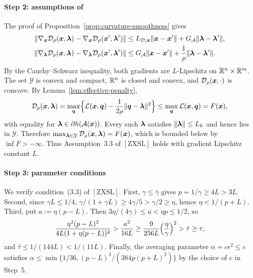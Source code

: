 \paragraph{Step 2: assumptions of~\cite[Theorem~3.4]{zhang2020smoothed}}
The proof of Proposition~\ref{prop:curvature-smoothness} gives
\[
\begin{aligned}
\|\nabla_{\bm{x}}\mathcal{D}_\rho(\bm{x},\bm{\lambda})-\nabla_{\bm{x}}\mathcal{D}_\rho(\bm{x}',\bm{\lambda}')\|
&\le L_{\mathcal{D},\bm{x}}\|\bm{x}-\bm{x}'\|+G_{\mathcal{A}}\|\bm{\lambda}-\bm{\lambda}'\|,\\
\|\nabla_{\bm{\lambda}}\mathcal{D}_\rho(\bm{x},\bm{\lambda})-\nabla_{\bm{\lambda}}\mathcal{D}_\rho(\bm{x}',\bm{\lambda}')\|
&\le G_{\mathcal{A}}\|\bm{x}-\bm{x}'\|+\frac1\rho\|\bm{\lambda}-\bm{\lambda}'\|.
\end{aligned}
\]
By the Cauchy--Schwarz inequality, both gradients are \(L\)-Lipschitz on
\(\mathbb{R}^n\times\mathbb{R}^m\). The set \(\mathcal Y\) is convex and compact,
\(\mathbb{R}^n\) is closed and convex, and \(\mathcal{D}_\rho(\bm{x},\cdot)\) is concave. By
Lemma~\ref{lem:effective-penalty},
\[
\mathcal{D}_\rho(\bm{x},\bm{\lambda})
=\max_{\bm{q}}\Bigl\{\mathcal{L}(\bm{x},\bm{q})-\frac1{2\rho}\|\bm{q}-\bm{\lambda}\|^2\Bigr\}
\le\max_{\bm{q}}\mathcal{L}(\bm{x},\bm{q})=F(\bm{x}),
\]
with equality for \(\bm{\lambda}\in\partial h(\mathcal{A}(\bm{x}))\). Every such
\(\bm{\lambda}\) satisfies \(\|\bm{\lambda}\|\le L_h\) and hence lies in \(\mathcal Y\).
Therefore \(\max_{\bm{\lambda}\in\mathcal Y}\mathcal{D}_\rho(\bm{x},\bm{\lambda})=F(\bm{x})\), which
is bounded below by \(\inf F>-\infty\). Thus Assumption~3.3 of
\([\mathrm{ZXSL}]\) holds with gradient Lipschitz constant \(L\).

\paragraph{Step 3: parameter conditions}
We verify condition~(3.3) of \([\mathrm{ZXSL}]\). First,
\(\gamma\le\bar\gamma\) gives \(p=1/\gamma\ge4L>3L\). Second, since
\(\gamma L\le1/4\),
\(\gamma/(1+\gamma L)\ge4\gamma/5>\gamma/2\ge\eta\), hence
\(\eta<1/(p+L)\). Third, put \(a:=\eta(p-L)\). Then
\(3\eta/(4\gamma)\le a<\eta p\le1/2\), so
\[
\frac{\eta^2(p-L)^2}{4L(1+\eta(p-L))^2}
>\frac{a^2}{16L}
\ge\frac9{256L}\Bigl(\frac\eta\gamma\Bigr)^2
>\bar\tau\ge\tau,
\]
and \(\bar\tau\le1/(144L)<1/(11L)\). Finally, the averaging parameter
\(\alpha=c\epsilon^2\le c\) satisfies
\(\alpha\le\min\{1/36,(p-L)^2/(384p(p+L)^2)\}\) by the choice of \(c\) in
Step~5.

